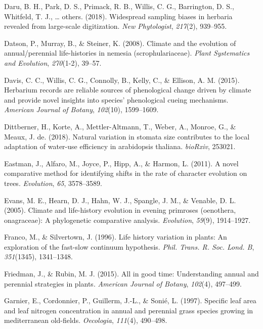 \documentclass[man,floatsintext]{apa6}
\theoremstyle{definition}
\theoremstyle{definition}
\theoremstyle{definition}
\theoremstyle{remark}
\begin{document}
\leavevmode\hypertarget{ref-daru2018widespread}{}%
Daru, B. H., Park, D. S., Primack, R. B., Willis, C. G., Barrington, D.
S., Whitfeld, T. J., \ldots{} others. (2018). Widespread sampling biases
in herbaria revealed from large-scale digitization. \emph{New
Phytologist}, \emph{217}(2), 939--955.

\leavevmode\hypertarget{ref-datson2008climate}{}%
Datson, P., Murray, B., \& Steiner, K. (2008). Climate and the evolution
of annual/perennial life-histories in nemesia (scrophulariaceae).
\emph{Plant Systematics and Evolution}, \emph{270}(1-2), 39--57.

\leavevmode\hypertarget{ref-davis2015herbarium}{}%
Davis, C. C., Willis, C. G., Connolly, B., Kelly, C., \& Ellison, A. M.
(2015). Herbarium records are reliable sources of phenological change
driven by climate and provide novel insights into species' phenological
cueing mechanisms. \emph{American Journal of Botany}, \emph{102}(10),
1599--1609.

\leavevmode\hypertarget{ref-dittberner2018natural}{}%
Dittberner, H., Korte, A., Mettler-Altmann, T., Weber, A., Monroe, G.,
\& Meaux, J. de. (2018). Natural variation in stomata size contributes
to the local adaptation of water-use efficiency in arabidopsis thaliana.
\emph{bioRxiv}, 253021.

\leavevmode\hypertarget{ref-R-geiger_b}{}%
Eastman, J., Alfaro, M., Joyce, P., Hipp, A., \& Harmon, L. (2011). A
novel comparative method for identifying shifts in the rate of character
evolution on trees. \emph{Evolution}, \emph{65}, 3578--3589.

\leavevmode\hypertarget{ref-evans2005climate}{}%
Evans, M. E., Hearn, D. J., Hahn, W. J., Spangle, J. M., \& Venable, D.
L. (2005). Climate and life-history evolution in evening primroses
(oenothera, onagraceae): A phylogenetic comparative analysis.
\emph{Evolution}, \emph{59}(9), 1914--1927.

\leavevmode\hypertarget{ref-franco1996life}{}%
Franco, M., \& Silvertown, J. (1996). Life history variation in plants:
An exploration of the fast-slow continuum hypothesis. \emph{Phil. Trans.
R. Soc. Lond. B}, \emph{351}(1345), 1341--1348.

\leavevmode\hypertarget{ref-friedman2015all}{}%
Friedman, J., \& Rubin, M. J. (2015). All in good time: Understanding
annual and perennial strategies in plants. \emph{American Journal of
Botany}, \emph{102}(4), 497--499.

\leavevmode\hypertarget{ref-garnier1997specific}{}%
Garnier, E., Cordonnier, P., Guillerm, J.-L., \& Sonié, L. (1997).
Specific leaf area and leaf nitrogen concentration in annual and
perennial grass species growing in mediterranean old-fields.
\emph{Oecologia}, \emph{111}(4), 490--498.
\end{document}
